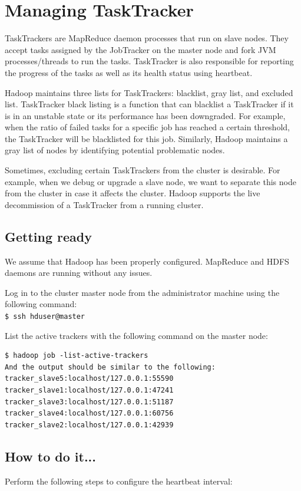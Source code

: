 \section{Managing TaskTracker}
TaskTrackers are MapReduce daemon processes that run on slave nodes. They accept tasks assigned by the JobTracker on the master node and fork JVM processes/threads to run the tasks. TaskTracker is also responsible for reporting the progress of the tasks as well as its health status using heartbeat.

Hadoop maintains three lists for TaskTrackers: blacklist, gray list, and excluded list. TaskTracker black listing is a function that can blacklist a TaskTracker if it is in an unstable state or its performance has been downgraded. For example, when the ratio of failed tasks for a specific job has reached a certain threshold, the TaskTracker will be blacklisted for this job. Similarly, Hadoop maintains a gray list of nodes by identifying potential problematic nodes.

Sometimes, excluding certain TaskTrackers from the cluster is desirable. For example, when we debug or upgrade a slave node, we want to separate this node from the cluster in case it affects the cluster. Hadoop supports the live decommission of a TaskTracker from a running cluster.

\subsection*{Getting ready}
We assume that Hadoop has been properly configured. MapReduce and HDFS daemons are running without any issues.

Log in to the cluster master node from the administrator machine using the following command: \\
\verb|$ ssh hduser@master|

List the active trackers with the following command on the master node:
\lstset{style=bashstyle}
\begin{lstlisting}
$ hadoop job -list-active-trackers
And the output should be similar to the following:
tracker_slave5:localhost/127.0.0.1:55590
tracker_slave1:localhost/127.0.0.1:47241
tracker_slave3:localhost/127.0.0.1:51187
tracker_slave4:localhost/127.0.0.1:60756
tracker_slave2:localhost/127.0.0.1:42939
\end{lstlisting}

\subsection*{How to do it...}
Perform the following steps to configure the heartbeat interval: 

